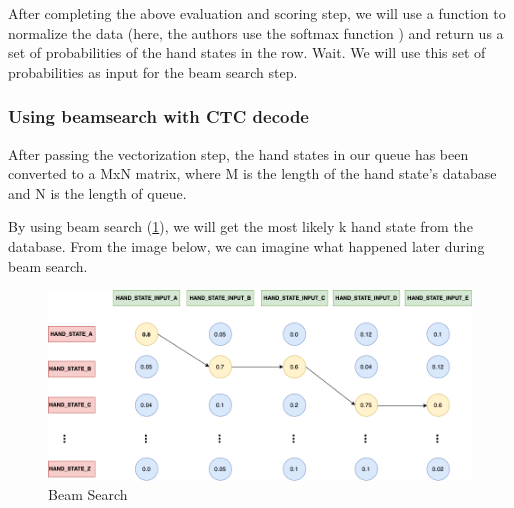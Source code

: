       
After completing the above evaluation and scoring step, we will use a function to normalize the data (here, the authors use the softmax function \cite{SoftMax}) and return us a set of probabilities of the hand states in the row. Wait. We will use this set of probabilities as input for the beam search step.

\subsubsection{ Using beamsearch with CTC decode }

After passing the vectorization step, the hand states in our queue has been converted to a MxN matrix, where M is the length of the hand state's database and N is the length of queue.

By using beam search (\ref{fig:Chap4-BeamSearch}), we will get the most likely k hand state from the database. From the image below, we can imagine what happened later during beam search.

      


\begin{figure}[H]
  \centering
  \includegraphics[width=\textwidth]{img/Chap4/BeamSearch.png}
  \caption{ Beam Search }
  \label{fig:Chap4-BeamSearch}
\end{figure}

